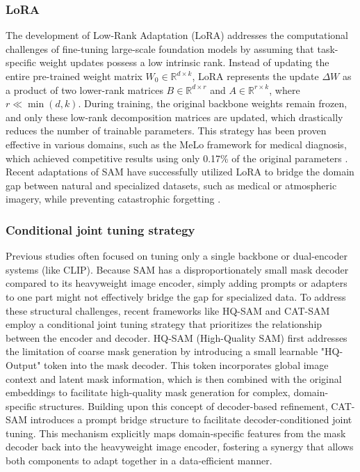 \subsubsection{LoRA}
The development of Low-Rank Adaptation (LoRA) addresses the computational challenges of fine-tuning large-scale foundation models by assuming that task-specific weight updates possess a low intrinsic rank. Instead of updating the entire pre-trained weight matrix $W_0 \in \mathbb{R}^{d \times k}$, LoRA represents the update $\Delta W$ as a product of two lower-rank matrices $B \in \mathbb{R}^{d \times r}$ and $A \in \mathbb{R}^{r \times k}$, where $r \ll \min(d, k)$. During training, the original backbone weights remain frozen, and only these low-rank decomposition matrices are updated, which drastically reduces the number of trainable parameters. This strategy has been proven effective in various domains, such as the MeLo framework for medical diagnosis, which achieved competitive results using only 0.17\% of the original parameters \cite{zhu2024melo}. Recent adaptations of SAM have successfully utilized LoRA to bridge the domain gap between natural and specialized datasets, such as medical or atmospheric imagery, while preventing catastrophic forgetting \cite{wu2025multi, zhang2024improving}.

\subsubsection{Conditional joint tuning strategy}
Previous studies often focused on tuning only a single backbone or dual-encoder systems (like CLIP). Because SAM has a disproportionately small mask decoder compared to its heavyweight image encoder, simply adding prompts or adapters to one part might not effectively bridge the gap for specialized data. To address these structural challenges, recent frameworks like HQ-SAM \cite{ke2023segment} and CAT-SAM \cite{xiao2024cat} employ a conditional joint tuning strategy that prioritizes the relationship between the encoder and decoder. HQ-SAM (High-Quality SAM) first addresses the limitation of coarse mask generation by introducing a small learnable "HQ-Output" token into the mask decoder. This token incorporates global image context and latent mask information, which is then combined with the original embeddings to facilitate high-quality mask generation for complex, domain-specific structures. Building upon this concept of decoder-based refinement, CAT-SAM introduces a prompt bridge structure to facilitate decoder-conditioned joint tuning. This mechanism explicitly maps domain-specific features from the mask decoder back into the heavyweight image encoder, fostering a synergy that allows both components to adapt together in a data-efficient manner.

